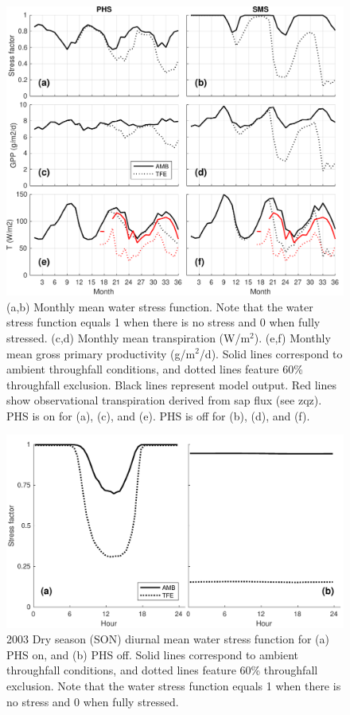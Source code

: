 \documentclass[draft,linenumbers]{agujournal}
\begin{document}
  \clearpage   
  \begin{figure}[h]
     \centering
     \includegraphics[width=30pc]{../figs2/fig3.pdf}
     \caption{(a,b) Monthly mean water stress function. Note that the water stress function equals 1 when there is no stress and 0 when fully stressed.
     (c,d) Monthly mean transpiration (W/m$^2$).
     (e,f) Monthly mean gross primary productivity (g/m$^2$/d). 
     Solid lines correspond to ambient throughfall conditions, and dotted lines feature 60\% throughfall exclusion.
     Black lines represent model output.
     Red lines show observational transpiration derived from sap flux (see zqz).
     PHS is on for (a), (c), and (e). PHS is off for (b), (d), and (f).
     }
     \label{fig:mm}
  \end{figure}
  
          \clearpage
    \begin{figure}[h]
     \centering
     \includegraphics[width=30pc]{../figs2/fig4.pdf}
     \caption{2003 Dry season (SON) diurnal mean water stress function for 
     (a) PHS on, and
     (b) PHS off.
     Solid lines correspond to ambient throughfall conditions, and dotted lines feature 60\% throughfall exclusion.
     Note that the water stress function equals 1 when there is no stress and 0 when fully stressed.
     }
     \label{fig4}
  \end{figure}
  
\end{document}
